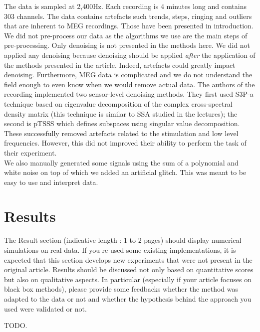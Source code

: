 \documentclass[11pt]{article}
\begin{document}
The data is sampled at 2,400Hz. Each recording is 4 minutes long and contains 303 channels. The data contains artefacts such trends, steps, ringing and outliers that are inherent to MEG recordings. Those have been presented in introduction.\\

We did not pre-process our data as the algorithms we use are the main steps of pre-processing. Only denoising is not presented in the methods here. We did not applied any denoising because denoising should be applied \textit{after} the application of the methods presented in the article. Indeed, artefacts could greatly impact denoising. Furthermore, MEG data is complicated and we do not understand the field enough to even know when we would remove actual data. The authors of the recording implemented two sensor-level denoising methods. They first used S3P-a technique based on eigenvalue decomposition of the complex cross-spectral density matrix (this technique is similar to SSA studied in the lectures); the second is pTSSS which defines subspaces using singular value decomposition. These successfully removed artefacts related to the stimulation and low level frequencies. However, this did not improved their ability to perform the task of their experiment.\\

We also manually generated some signals using the sum of a polynomial and white noise on top of which we added an artificial glitch. This was meant to be easy to use and interpret data.\\ 

\section{Results}
The Result section (indicative length : 1 to 2 pages) should display numerical simulations on real data. If you re-used some existing implementations, it is expected that this section develops new experiments that were not present in the original article. Results should be discussed not only based on quantitative scores but also on qualitative aspects. In particular (especially if your article focuses on black box methods), please provide some feedbacks whether the method was adapted to the data or not and whether the hypothesis behind the approach you used were validated or not.

TODO.

\newpage

\printbibliography[heading=bibintoc]
\end{document}
